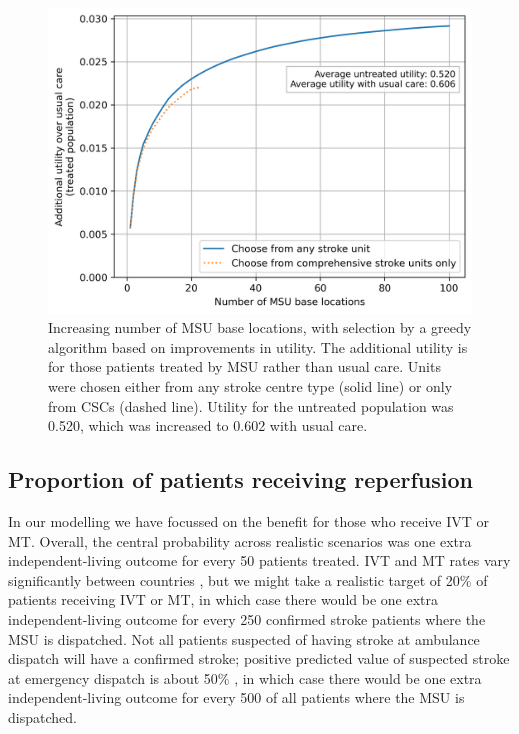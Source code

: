 \begin{figure}[h]
    \centering
    \includegraphics[width=0.5\linewidth]{images/msu_advantages_greedy.png}
    \caption{Increasing number of MSU base locations, with selection by a greedy algorithm based on improvements in utility. The additional utility is for those patients treated by MSU rather than usual care. Units were chosen either from any stroke centre type (solid line) or only from CSCs (dashed line). Utility for the untreated population was 0.520, which was increased to 0.602 with usual care.}
    \label{fig:greedy}
\end{figure}

\subsection{Proportion of patients receiving reperfusion}

In our modelling we have focussed on the benefit for those who receive IVT or MT. Overall, the central probability across realistic scenarios was one extra independent-living outcome for every 50 patients treated. IVT and MT rates vary significantly between countries \cite{kim_global_2024}, but we might take a realistic target of 20\% of patients receiving IVT or MT, in which case there would be one extra independent-living outcome for every 250 confirmed stroke patients where the MSU is dispatched. Not all patients suspected of having stroke at ambulance dispatch will have a confirmed stroke; positive predicted value of suspected stroke at emergency dispatch is about 50\% \cite{wenstrup_emergency_2024}, in which case there would be one extra independent-living outcome for every 500 of all patients where the MSU is dispatched.